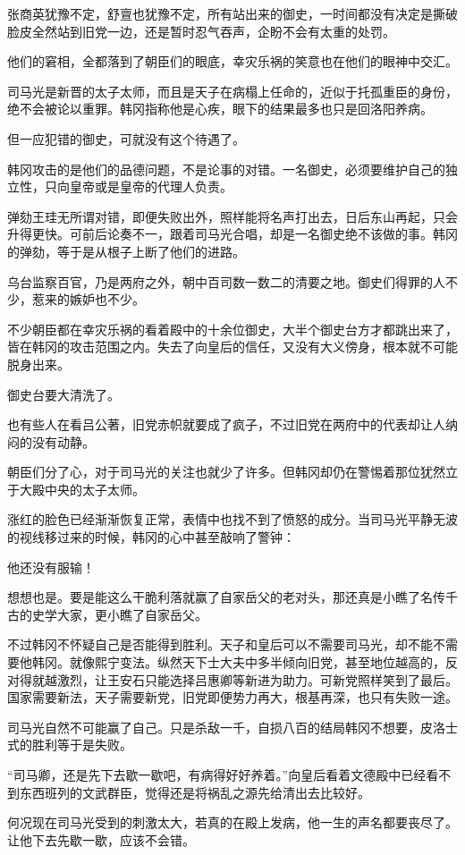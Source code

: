 张商英犹豫不定，舒亶也犹豫不定，所有站出来的御史，一时间都没有决定是撕破脸皮全然站到旧党一边，还是暂时忍气吞声，企盼不会有太重的处罚。

他们的窘相，全都落到了朝臣们的眼底，幸灾乐祸的笑意也在他们的眼神中交汇。

司马光是新晋的太子太师，而且是天子在病榻上任命的，近似于托孤重臣的身份，绝不会被论以重罪。韩冈指称他是心疾，眼下的结果最多也只是回洛阳养病。

但一应犯错的御史，可就没有这个待遇了。

韩冈攻击的是他们的品德问题，不是论事的对错。一名御史，必须要维护自己的独立性，只向皇帝或是皇帝的代理人负责。

弹劾王珪无所谓对错，即便失败出外，照样能将名声打出去，日后东山再起，只会升得更快。可前后论奏不一，跟着司马光合唱，却是一名御史绝不该做的事。韩冈的弹劾，等于是从根子上断了他们的进路。

乌台监察百官，乃是两府之外，朝中百司数一数二的清要之地。御史们得罪的人不少，惹来的嫉妒也不少。

不少朝臣都在幸灾乐祸的看着殿中的十余位御史，大半个御史台方才都跳出来了，皆在韩冈的攻击范围之内。失去了向皇后的信任，又没有大义傍身，根本就不可能脱身出来。

御史台要大清洗了。

也有些人在看吕公著，旧党赤帜就要成了疯子，不过旧党在两府中的代表却让人纳闷的没有动静。

朝臣们分了心，对于司马光的关注也就少了许多。但韩冈却仍在警惕着那位犹然立于大殿中央的太子太师。

涨红的脸色已经渐渐恢复正常，表情中也找不到了愤怒的成分。当司马光平静无波的视线移过来的时候，韩冈的心中甚至敲响了警钟：

他还没有服输！

想想也是。要是能这么干脆利落就赢了自家岳父的老对头，那还真是小瞧了名传千古的史学大家，更小瞧了自家岳父。

不过韩冈不怀疑自己是否能得到胜利。天子和皇后可以不需要司马光，却不能不需要他韩冈。就像熙宁变法。纵然天下士大夫中多半倾向旧党，甚至地位越高的，反对得就越激烈，让王安石只能选择吕惠卿等新进为助力。可新党照样笑到了最后。国家需要新法，天子需要新党，旧党即便势力再大，根基再深，也只有失败一途。

司马光自然不可能赢了自己。只是杀敌一千，自损八百的结局韩冈不想要，皮洛士式的胜利等于是失败。

“司马卿，还是先下去歇一歇吧，有病得好好养着。”向皇后看着文德殿中已经看不到东西班列的文武群臣，觉得还是将祸乱之源先给清出去比较好。

何况现在司马光受到的刺激太大，若真的在殿上发病，他一生的声名都要丧尽了。让他下去先歇一歇，应该不会错。

